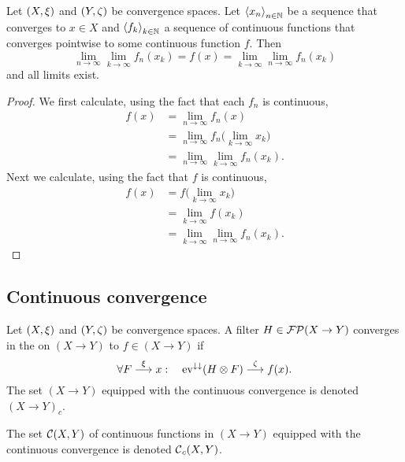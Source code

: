 \begin{lemma} \label{interchangeLimitsWithContinuousLimitFunction}
Let $\sSet{X,\xi}$ and $\sSet{Y,\zeta}$ be convergence spaces. Let $\left\langle x_n \right\rangle_{n\in \mathbb{N}}$ be a sequence that converges to $x\in X$ and $\left\langle f_k \right\rangle_{k\in \mathbb{N}}$ a sequence of continuous functions that converges pointwise to some continuous function $f$. Then
\[ \lim_{n\to \infty}\lim_{k\to\infty}f_n(x_k) = f(x) = \lim_{k\to \infty}\lim_{n\to\infty}f_n(x_k) \]
and all limits exist.
\end{lemma}
\begin{proof}
We first calculate, using the fact that each $f_n$ is continuous,
\begin{align*}
f(x) &= \lim_{n\to \infty}f_n(x) \\
&= \lim_{n\to \infty}f_n\big(\lim_{k\to\infty} x_k\big) \\
&= \lim_{n\to \infty}\lim_{k\to\infty}f_n(x_k).
\end{align*}
Next we calculate, using the fact that $f$ is continuous,
\begin{align*}
f(x) &= f\big(\lim_{k\to\infty} x_k\big) \\
&= \lim_{k\to\infty} f(x_k) \\
&= \lim_{k\to\infty} \lim_{n\to \infty} f_n(x_k).
\end{align*}
\end{proof}


\subsection{Continuous convergence}
\begin{definition}
Let $\sSet{X, \xi}$ and $\sSet{Y,\zeta}$ be convergence spaces. 
A filter $H\in \operatorname{\mathcal{FP}}(X\to Y)$ converges in the  on $(X\to Y)$ to $f\in (X\to Y)$ if
\[ \forall F\overset{\xi}{\longrightarrow} x: \quad \operatorname{ev}^{\downarrow\downarrow}(H \otimes F) \overset{\zeta}{\longrightarrow} f(x). \]
The set $(X\to Y)$ equipped with the continuous convergence is denoted $(X\to Y)_c$.

The set $\operatorname{\mathcal{C}}(X, Y)$ of continuous functions in $(X\to Y)$ equipped with the continuous convergence is denoted $\operatorname{\mathcal{C}}_c(X, Y)$.
\end{definition}

